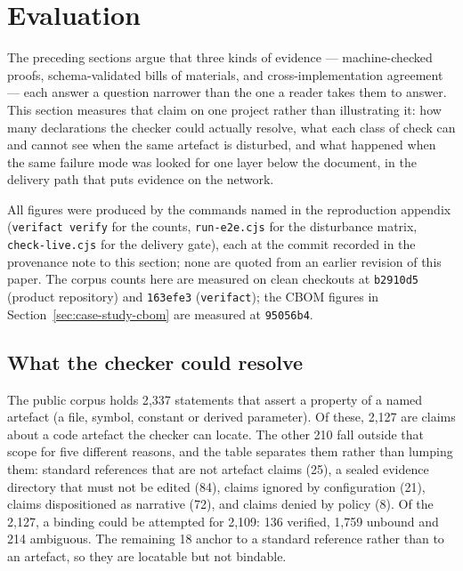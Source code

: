 \section{Evaluation}
\label{sec:evaluation}

The preceding sections argue that three kinds of evidence --- machine-checked
proofs, schema-validated bills of materials, and cross-implementation
agreement --- each answer a question narrower than the one a reader takes them
to answer. This section measures that claim on one project rather than
illustrating it: how many declarations the checker could actually resolve, what
each class of check can and cannot see when the same artefact is disturbed, and
what happened when the same failure mode was looked for one layer below the
document, in the delivery path that puts evidence on the network.

All figures were produced by the commands named in the reproduction appendix
(\texttt{verifact verify} for the counts, \texttt{run-e2e.cjs} for the
disturbance matrix, \texttt{check-live.cjs} for the delivery gate), each at
the commit recorded in the provenance note to this section; none are quoted
from an earlier revision of this paper. The corpus counts here are measured on
clean checkouts at \texttt{b2910d5} (product repository) and \texttt{163efe3}
(\texttt{verifact}); the CBOM figures in Section~\ref{sec:case-study-cbom} are
measured at \texttt{95056b4}.

\subsection{What the checker could resolve}

The public corpus holds 2{,}337 statements that assert a property of a named
artefact (a file, symbol, constant or derived parameter). Of these, 2{,}127 are
claims about a code artefact the checker can locate. The other 210 fall outside
that scope for five different reasons, and the table separates them rather than
lumping them: standard references that are not artefact claims (25), a sealed
evidence directory that must not be edited (84), claims ignored by configuration
(21), claims dispositioned as narrative (72), and claims denied by policy (8).
Of the 2{,}127, a binding could be attempted for 2{,}109: 136 verified, 1{,}759
unbound and 214 ambiguous. The remaining 18 anchor to a standard reference
rather than to an artefact, so they are locatable but not bindable.

